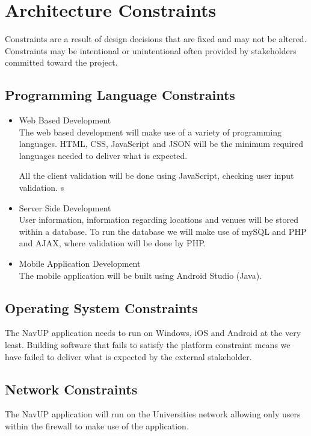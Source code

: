 \documentclass{article}
\begin{document}
	\section{Architecture Constraints}
	Constraints are a result of design decisions that are fixed and may not be altered. Constraints may be intentional or unintentional often provided by stakeholders committed toward the project.
		
		\subsection{Programming Language Constraints}
			\begin{itemize}
 				\item Web Based Development
 				\bigskip
 				\\ 				
 				The web based development will make use of a variety of programming languages. HTML, CSS, JavaScript and JSON will be the minimum required languages needed to deliver what is expected.
 				
 				All the client validation will be done using JavaScript, checking user input validation.			
s 				
  				\item Server Side Development
  				\bigskip
				\\
 				User information, information regarding locations and venues will be stored within a database. To run the database we will make use of mySQL and PHP and AJAX, where validation will be done by PHP.
 				
 				\item Mobile Application  Development
  				\bigskip
 				\\
 				The mobile application will be built using Android Studio (Java).
 							
			\end{itemize}


		\subsection{Operating System Constraints}			   
 				The NavUP application needs to run on Windows, iOS and Android at the very least. Building software that fails to satisfy the platform constraint means we have failed to deliver what is expected by the external stakeholder. 
 				
 		\subsection{Network Constraints}			 
 				The NavUP application will run on the Universities network allowing only users within the firewall to make use of the application.
 				
\end{document}
